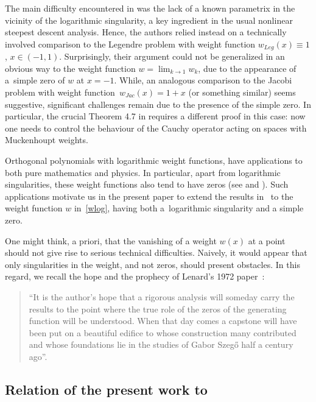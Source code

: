 The main difficulty encountered in \cite{CD} was the lack of a known parametrix in the vicinity of the logarithmic singularity, a key ingredient in the usual nonlinear steepest descent analysis. Hence, the authors relied instead on a technically involved comparison to the Legendre problem with weight function $w_{Leg}(x) \equiv 1$, $x \in (-1,1)$. Surprisingly, their argument could not be generalized in an obvious way to the weight function $w = \lim_{k\to 1} w_k$, due to the appearance of a~simple zero of $w$ at $x = -1$. While, an analogous comparison to the Jacobi problem with weight function~$w_{Jac}(x) = 1+x$ (or something similar) seems suggestive, significant challenges remain due to the presence of the simple zero. In particular, the crucial Theorem 4.7 in \cite{CD} requires a different proof in this case: now one needs to control the behaviour of the Cauchy operator acting on spaces with Muckenhoupt weights.

Orthogonal polynomials with logarithmic weight functions, have applications to both pure mathematics and physics. In particular, apart from logarithmic singularities, these weight functions also tend to have zeros (see \cite[Section~8]{Mag18} and \cite{VA}). Such applications motivate us in the present paper to extend the results in~\cite{CD} to the weight function $w$ in~\eqref{wlog}, having both a~logarithmic singularity and a simple zero.

\begin{Remark}
 One might think, a priori, that the vanishing of a weight $w(x)$ at a point should not give rise to serious technical difficulties. Naively, it would appear that only singularities in the weight, and not zeros, should present obstacles. In this regard, we recall the hope and the prophecy of Lenard's 1972 paper~\cite{Lenard}:
 \begin{quote}
 ``It is the author’s hope that a
rigorous analysis will someday carry the results to the point where the true role of the zeros of the
generating function will be understood. When that day comes a capstone will have been put on a
beautiful edifice to whose construction many contributed and whose foundations lie in the studies
of Gabor Szeg\H{o} half a century ago''.
\end{quote}
\end{Remark}

\subsection[Relation of the present work to cite\{CD\}]{Relation of the present work to \cite{CD}}

